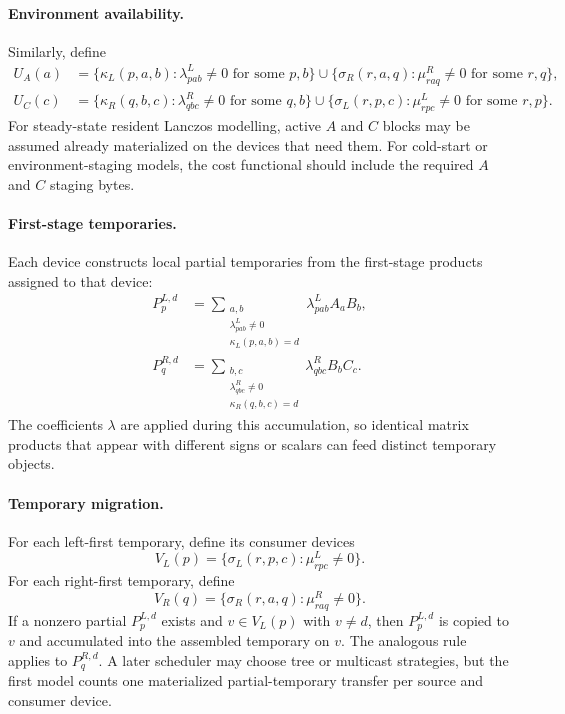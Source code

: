 \documentclass[11pt]{article}
\begin{document}
\paragraph{Environment availability.}
Similarly, define
\begin{align}
  U_A(a) &=
    \{ \kappa_L(p,a,b) : \lambda^L_{pab}\ne 0 \text{ for some } p,b \}
    \cup
    \{ \sigma_R(r,a,q) : \mu^R_{raq}\ne 0 \text{ for some } r,q \}, \\
  U_C(c) &=
    \{ \kappa_R(q,b,c) : \lambda^R_{qbc}\ne 0 \text{ for some } q,b \}
    \cup
    \{ \sigma_L(r,p,c) : \mu^L_{rpc}\ne 0 \text{ for some } r,p \}.
\end{align}
For steady-state resident Lanczos modelling, active $A$ and $C$ blocks may be
assumed already materialized on the devices that need them.  For cold-start or
environment-staging models, the cost functional should include the required
$A$ and $C$ staging bytes.

\paragraph{First-stage temporaries.}
Each device constructs local partial temporaries from the first-stage products
assigned to that device:
\begin{align}
  P^{L,d}_p &=
    \sum_{\substack{a,b\\ \lambda^L_{pab}\ne 0\\ \kappa_L(p,a,b)=d}}
      \lambda^L_{pab} A_aB_b,\\
  P^{R,d}_q &=
    \sum_{\substack{b,c\\ \lambda^R_{qbc}\ne 0\\ \kappa_R(q,b,c)=d}}
      \lambda^R_{qbc} B_bC_c.
\end{align}
The coefficients $\lambda$ are applied during this accumulation, so identical
matrix products that appear with different signs or scalars can feed distinct
temporary objects.

\paragraph{Temporary migration.}
For each left-first temporary, define its consumer devices
\begin{equation}
  V_L(p) = \{ \sigma_L(r,p,c) : \mu^L_{rpc}\ne 0 \}.
\end{equation}
For each right-first temporary, define
\begin{equation}
  V_R(q) = \{ \sigma_R(r,a,q) : \mu^R_{raq}\ne 0 \}.
\end{equation}
If a nonzero partial $P^{L,d}_p$ exists and $v \in V_L(p)$ with $v\ne d$, then
$P^{L,d}_p$ is copied to $v$ and accumulated into the assembled temporary on
$v$.  The analogous rule applies to $P^{R,d}_q$.  A later scheduler may choose
tree or multicast strategies, but the first model counts one materialized
partial-temporary transfer per source and consumer device.
\end{document}
